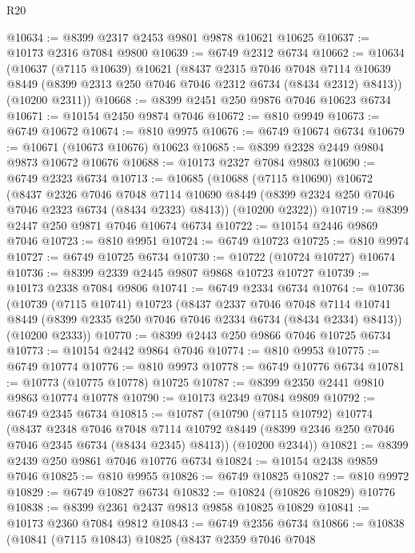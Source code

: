 \begin{lexlean}{R20}
\begin{coremodule}
{@10634 := @8399 @2317 @2453 @9801 @9878 @10621 @10625
@10637 := @10173 @2316 @7084 @9800
@10639 := @6749 @2312 @6734
@10662 := @10634
    (@10637
      (@7115 @10639)
      @10621
      (@8437
        @2315
        @7046
        @7048
        @7114
        @10639
        @8449
        (@8399 @2313 @250 @7046 @7046 @2312 @6734 (@8434 @2312) @8413))
      (@10200 @2311))
@10668 := @8399 @2451 @250 @9876 @7046 @10623 @6734
@10671 := @10154 @2450 @9874 @7046
@10672 := @810 @9949
@10673 := @6749 @10672
@10674 := @810 @9975
@10676 := @6749 @10674 @6734
@10679 := @10671 (@10673 @10676) @10623
@10685 := @8399 @2328 @2449 @9804 @9873 @10672 @10676
@10688 := @10173 @2327 @7084 @9803
@10690 := @6749 @2323 @6734
@10713 := @10685
    (@10688
      (@7115 @10690)
      @10672
      (@8437
        @2326
        @7046
        @7048
        @7114
        @10690
        @8449
        (@8399 @2324 @250 @7046 @7046 @2323 @6734 (@8434 @2323) @8413))
      (@10200 @2322))
@10719 := @8399 @2447 @250 @9871 @7046 @10674 @6734
@10722 := @10154 @2446 @9869 @7046
@10723 := @810 @9951
@10724 := @6749 @10723
@10725 := @810 @9974
@10727 := @6749 @10725 @6734
@10730 := @10722 (@10724 @10727) @10674
@10736 := @8399 @2339 @2445 @9807 @9868 @10723 @10727
@10739 := @10173 @2338 @7084 @9806
@10741 := @6749 @2334 @6734
@10764 := @10736
    (@10739
      (@7115 @10741)
      @10723
      (@8437
        @2337
        @7046
        @7048
        @7114
        @10741
        @8449
        (@8399 @2335 @250 @7046 @7046 @2334 @6734 (@8434 @2334) @8413))
      (@10200 @2333))
@10770 := @8399 @2443 @250 @9866 @7046 @10725 @6734
@10773 := @10154 @2442 @9864 @7046
@10774 := @810 @9953
@10775 := @6749 @10774
@10776 := @810 @9973
@10778 := @6749 @10776 @6734
@10781 := @10773 (@10775 @10778) @10725
@10787 := @8399 @2350 @2441 @9810 @9863 @10774 @10778
@10790 := @10173 @2349 @7084 @9809
@10792 := @6749 @2345 @6734
@10815 := @10787
    (@10790
      (@7115 @10792)
      @10774
      (@8437
        @2348
        @7046
        @7048
        @7114
        @10792
        @8449
        (@8399 @2346 @250 @7046 @7046 @2345 @6734 (@8434 @2345) @8413))
      (@10200 @2344))
@10821 := @8399 @2439 @250 @9861 @7046 @10776 @6734
@10824 := @10154 @2438 @9859 @7046
@10825 := @810 @9955
@10826 := @6749 @10825
@10827 := @810 @9972
@10829 := @6749 @10827 @6734
@10832 := @10824 (@10826 @10829) @10776
@10838 := @8399 @2361 @2437 @9813 @9858 @10825 @10829
@10841 := @10173 @2360 @7084 @9812
@10843 := @6749 @2356 @6734
@10866 := @10838
    (@10841
      (@7115 @10843)
      @10825
      (@8437
        @2359
        @7046
        @7048
}
\end{coremodule}
\end{lexlean}
